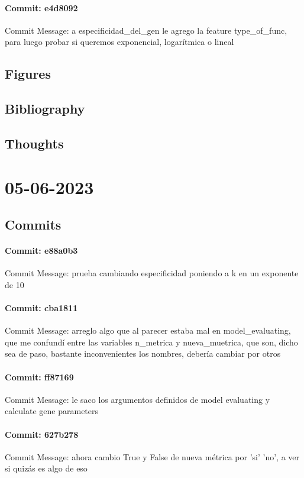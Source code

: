 \documentclass{article}
\begin{document}
\paragraph{Commit: e4d8092}
Commit Message: a especificidad_del_gen le agrego la feature type_of_func, para luego probar si queremos exponencial, logarítmica o lineal

\subsection{Figures}
\subsection{Bibliography}
\subsection{Thoughts}

\section{05-06-2023}
\subsection{Commits}
\paragraph{Commit: e88a0b3}
Commit Message: prueba cambiando especificidad poniendo a k en un exponente de 10

\paragraph{Commit: cba1811}
Commit Message: arreglo algo que al parecer estaba mal en model_evaluating, que me confundí entre las variables n_metrica y nueva_muetrica, que son, dicho sea de paso, bastante inconvenientes los nombres, debería cambiar por otros

\paragraph{Commit: ff87169}
Commit Message: le saco los argumentos definidos de model evaluating y calculate gene parameters

\paragraph{Commit: 627b278}
Commit Message: ahora cambio True y False de nueva métrica por 'si' 'no', a ver si quizás es algo de eso
\end{document}
